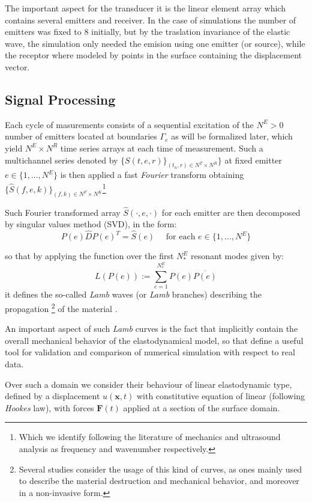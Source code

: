 The important aspect for the transducer it is the linear element array which contains several emitters and receiver. In the case of simulations the number of emitters was fixed to 8 initially, but by the traslation invariance of the elastic wave, the simulation only needed the emision using one emitter (or source), while the receptor where modeled by points in the surface containing the displacement vector.

\subsection{Signal Processing}
Each cycle of masurements consists of a sequential excitation of the $N^E > 0$ number of emitters located at boundaries $\Gamma_{e}$ as will be formalized later, which yield $N^E \times N^R$ time series arrays at each time of measurement.
Such a multichannel series denoted by $\{ S(t,e,r) \}_{(t_n,r) \in N^T\times N^R}\}$ at fixed emitter $e \in \{1, \dots, N^E\}$ is then applied a fast \textit{Fourier} transform obtaining $\{ \hat{S}(f,e,k) \}_{(f,k) \in N^F\times N^K}$\footnote{Which we identify following the literature of mechanics and ultrasound analysis as frequency and wavenumber respectively.}

Such Fourier transformed array $\hat{S}(\cdot, e, \cdot)$ for each emitter are then decomposed by singular values method (SVD), in the form:
\begin{equation*}
    P(e) \hat{D} P(e)^T = \hat{S}(e) \quad \text{ for each } e \in \{1, \dots, N^E \}
\end{equation*}

so that by applying the function over the first $N^E_*$ resonant modes given by:
\begin{equation*}
    L(P(e)) := \sum \limits_{e = 1}^{N^E_*} P(e) \overline{P(e)}
\end{equation*}
it defines the so-called \textit{Lamb} waves (or \textit{Lamb} branches) describing the propagation \footnote{Several studies consider the usage of this kind of curves, as ones mainly used to describe the material destruction and mechanical behavior, and moreover in a non-invasive form.} of the material \cite{Rhee2007}.

An important aspect of such \textit{Lamb} curves is the fact that implicitly contain the overall mechanical behavior of the elastodynamical model, so that define a useful tool for validation and comparison of numerical simulation with respect to real data. 


Over such a domain we consider their behaviour of linear elastodynamic type, defined by a displacement $u(\mathbf{x},t)$ with constitutive equation of linear (following \textit{Hookes} law), with forces $\mathbf{F}(t)$ applied at a section of the surface domain. \\

